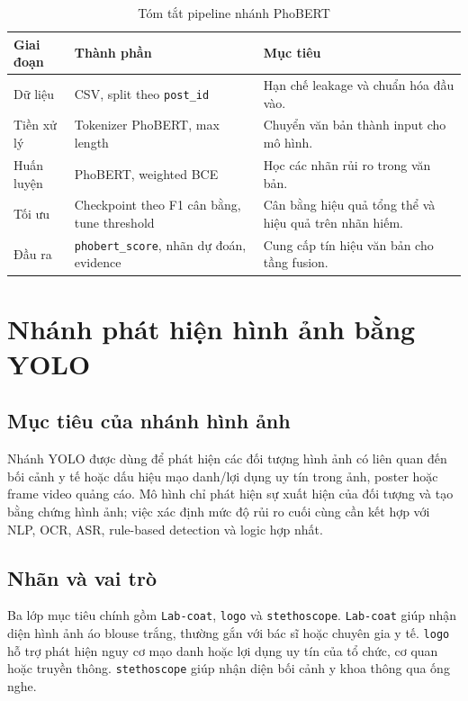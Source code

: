 \begin{table}[H]
\centering
\caption{Tóm tắt pipeline nhánh PhoBERT}
\label{tab:phobert_method_pipeline}
\begin{tabularx}{\textwidth}{|L{0.25\textwidth}|L{0.30\textwidth}|Y|}
\hline
\textbf{Giai đoạn} & \textbf{Thành phần} & \textbf{Mục tiêu} \\
\hline
Dữ liệu & CSV, split theo \texttt{post\_id} & Hạn chế leakage và chuẩn hóa đầu vào. \\ \hline
Tiền xử lý & Tokenizer PhoBERT, max length & Chuyển văn bản thành input cho mô hình. \\ \hline
Huấn luyện & PhoBERT, weighted BCE & Học các nhãn rủi ro trong văn bản. \\ \hline
Tối ưu & Checkpoint theo F1 cân bằng, tune threshold & Cân bằng hiệu quả tổng thể và hiệu quả trên nhãn hiếm. \\ \hline
Đầu ra & \texttt{phobert\_score}, nhãn dự đoán, evidence & Cung cấp tín hiệu văn bản cho tầng fusion. \\ \hline
\end{tabularx}
\end{table}

\section{Nhánh phát hiện hình ảnh bằng YOLO}
\subsection{Mục tiêu của nhánh hình ảnh}
Nhánh YOLO được dùng để phát hiện các đối tượng hình ảnh có liên quan đến bối cảnh y tế hoặc dấu hiệu mạo danh/lợi dụng uy tín trong ảnh, poster hoặc frame video quảng cáo. Mô hình chỉ phát hiện sự xuất hiện của đối tượng và tạo bằng chứng hình ảnh; việc xác định mức độ rủi ro cuối cùng cần kết hợp với NLP, OCR, ASR, rule-based detection và logic hợp nhất.

\subsection{Nhãn và vai trò}
Ba lớp mục tiêu chính gồm \texttt{Lab-coat}, \texttt{logo} và \texttt{stethoscope}. \texttt{Lab-coat} giúp nhận diện hình ảnh áo blouse trắng, thường gắn với bác sĩ hoặc chuyên gia y tế. \texttt{logo} hỗ trợ phát hiện nguy cơ mạo danh hoặc lợi dụng uy tín của tổ chức, cơ quan hoặc truyền thông. \texttt{stethoscope} giúp nhận diện bối cảnh y khoa thông qua ống nghe.

